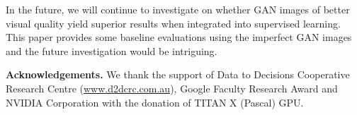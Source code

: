 \documentclass[10pt,twocolumn,letterpaper]{article}
\begin{document}
In the future, we will continue to investigate on whether GAN images of better visual quality yield superior results when integrated into supervised learning. This paper provides some baseline evaluations using the imperfect GAN images and the future investigation would be intriguing. 

\textbf{Acknowledgements.} We thank the support of Data to Decisions Cooperative Research Centre (\url{www.d2dcrc.com.au}), Google Faculty Research Award and NVIDIA Corporation with the donation of TITAN X (Pascal) GPU.

{
\footnotesize


}
\end{document}
